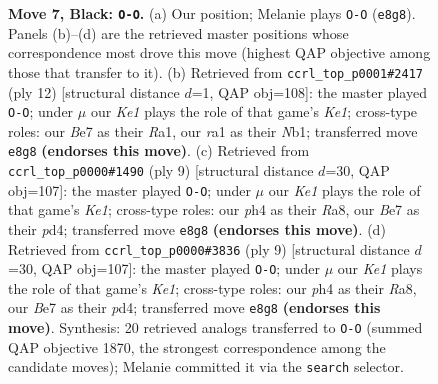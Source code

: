 \documentclass[11pt]{article}
\begin{document}
\begin{figure}[p]
\caption{\textbf{Move 7, Black: \texttt{O-O}.} (a) Our position; Melanie plays \texttt{O-O} (\texttt{e8g8}). Panels (b)--(d) are the retrieved master positions whose correspondence most drove this move (highest QAP objective among those that transfer to it). (b) Retrieved from \texttt{ccrl\_top\_p0001\#2417} (ply 12) [structural distance $d$=1, QAP obj=108]: the master played \texttt{O-O}; under $\mu$ our \emph{Ke1} plays the role of that game's \emph{Ke1}; cross-type roles: our \emph{B}e7 as their \emph{R}a1, our \emph{r}a1 as their \emph{N}b1; transferred move \texttt{e8g8} \textbf{(endorses this move)}. (c) Retrieved from \texttt{ccrl\_top\_p0000\#1490} (ply 9) [structural distance $d$=30, QAP obj=107]: the master played \texttt{O-O}; under $\mu$ our \emph{Ke1} plays the role of that game's \emph{Ke1}; cross-type roles: our \emph{p}h4 as their \emph{R}a8, our \emph{B}e7 as their \emph{p}d4; transferred move \texttt{e8g8} \textbf{(endorses this move)}. (d) Retrieved from \texttt{ccrl\_top\_p0000\#3836} (ply 9) [structural distance $d$=30, QAP obj=107]: the master played \texttt{O-O}; under $\mu$ our \emph{Ke1} plays the role of that game's \emph{Ke1}; cross-type roles: our \emph{p}h4 as their \emph{R}a8, our \emph{B}e7 as their \emph{p}d4; transferred move \texttt{e8g8} \textbf{(endorses this move)}. Synthesis: 20 retrieved analogs transferred to \texttt{O-O} (summed QAP objective 1870, the strongest correspondence among the candidate moves); Melanie committed it via the \texttt{search} selector.}
\label{fig:thought-m13}
\end{figure}

\clearpage
\end{document}
